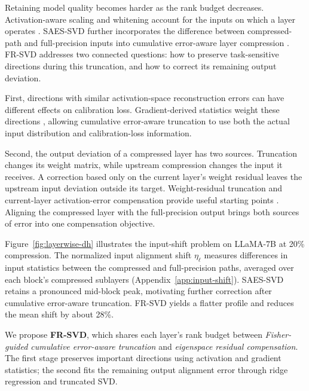\documentclass[11pt]{article}
\begin{document}
Retaining model quality becomes harder as the rank budget decreases. Activation-aware scaling and whitening account for the inputs on which a layer operates \citep{yuan2023asvd,wang2025svdllm,wang2025svdllmv2}. SAES-SVD further incorporates the difference between compressed-path and full-precision inputs into cumulative error-aware layer compression \citep{hu2026saessvd}. FR-SVD addresses two connected questions: how to preserve task-sensitive directions during this truncation, and how to correct its remaining output deviation.

First, directions with similar activation-space reconstruction errors can have different effects on calibration loss. Gradient-derived statistics weight these directions \citep{hsu2022fwsvd,chekalina2025gfwsvd}, allowing cumulative error-aware truncation to use both the actual input distribution and calibration-loss information.

Second, the output deviation of a compressed layer has two sources. Truncation changes its weight matrix, while upstream compression changes the input it receives. A correction based only on the current layer's weight residual leaves the upstream input deviation outside its target. Weight-residual truncation and current-layer activation-error compensation provide useful starting points \citep{bai2025ercsvd,liu2025eora}. Aligning the compressed layer with the full-precision output brings both sources of error into one compensation objective.

Figure~\ref{fig:layerwise-dh} illustrates the input-shift problem on LLaMA-7B at 20\% compression. The normalized input alignment shift $\eta_\ell$ measures differences in input statistics between the compressed and full-precision paths, averaged over each block's compressed sublayers (Appendix~\ref{app:input-shift}). SAES-SVD retains a pronounced mid-block peak, motivating further correction after cumulative error-aware truncation. FR-SVD yields a flatter profile and reduces the mean shift by about 28\%.



We propose \textbf{FR-SVD}, which shares each layer's rank budget between \emph{Fisher-guided cumulative error-aware truncation} and \emph{eigenspace residual compensation}. The first stage preserves important directions using activation and gradient statistics; the second fits the remaining output alignment error through ridge regression and truncated SVD.
\end{document}
